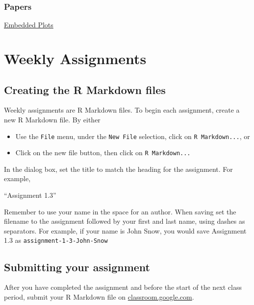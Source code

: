 \documentclass[]{book}
\providecommand{\tightlist}{%
  \setlength{\itemsep}{0pt}\setlength{\parskip}{0pt}}
\theoremstyle{definition}
\theoremstyle{definition}
\theoremstyle{remark}
\begin{document}
\subsection*{Papers}\label{papers}

\href{http://vita.had.co.nz/papers/embedded-plots.pdf}{Embedded Plots}

\chapter*{Weekly Assignments}\label{weekly-assignments}

\section*{Creating the R Markdown
files}\label{creating-the-r-markdown-files}

Weekly assignments are R Markdown files. To begin each assignment,
create a new R Markdown file. By either

\begin{itemize}
\tightlist
\item
  Use the \texttt{File} menu, under the \texttt{New\ File} selection,
  click on \texttt{R\ Markdown...}, or
\item
  Click on the new file button, then click on \texttt{R\ Markdown...}
\end{itemize}

In the dialog box, set the title to match the heading for the
assignment. For example,

``Assignment 1.3''

Remember to use your name in the space for an author. When saving set
the filename to the assignment followed by your first and last name,
using dashes as separators. For example, if your name is John Snow, you
would save Assignment 1.3 as \texttt{assignment-1-3-John-Snow}

\section*{Submitting your assignment}\label{submitting-your-assignment}

After you have completed the assignment and before the start of the next
class period, submit your R Markdown file on
\href{https//classroom.google.com}{classroom.google.com}.
\end{document}
